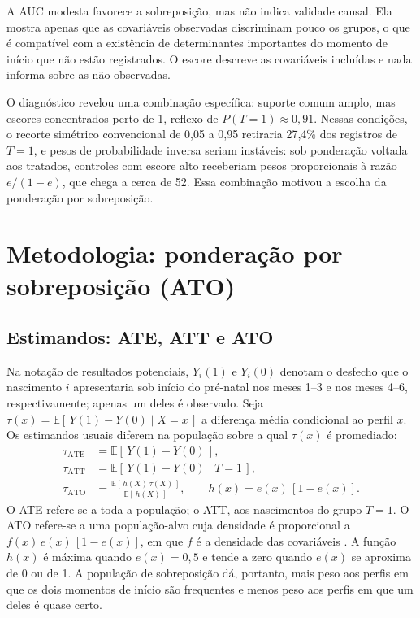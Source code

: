 \documentclass[11pt,a4paper]{article}
\newcommand{\E}{\mathbb{E}}
\newcommand{\ATO}{\mathrm{ATO}}
\begin{document}
A AUC modesta favorece a sobreposição, mas não indica validade causal. Ela mostra apenas
que as covariáveis observadas discriminam pouco os grupos, o que é compatível com a
existência de determinantes importantes do momento de início que não estão registrados. O
escore descreve as covariáveis incluídas e nada informa sobre as não observadas.

O diagnóstico revelou uma combinação específica: suporte comum amplo, mas escores
concentrados perto de 1, reflexo de $P(T=1) \approx 0{,}91$. Nessas condições, o recorte
simétrico convencional de 0,05 a 0,95 retiraria 27,4\% dos registros de $T=1$, e pesos
de probabilidade inversa seriam instáveis: sob ponderação voltada aos tratados, controles
com escore alto receberiam pesos proporcionais à razão $e/(1-e)$, que chega a cerca de 52.
Essa combinação motivou a escolha da ponderação por sobreposição.

\section{Metodologia: ponderação por sobreposição (ATO)}\label{sec:ato}

\subsection{Estimandos: ATE, ATT e ATO}

Na notação de resultados potenciais, $Y_i(1)$ e $Y_i(0)$ denotam o desfecho que o
nascimento $i$ apresentaria sob início do pré-natal nos meses 1--3 e nos meses 4--6,
respectivamente; apenas um deles é observado. Seja
$\tau(x) = \E[\,Y(1) - Y(0) \mid X = x\,]$ a diferença média condicional ao perfil $x$. Os
estimandos usuais diferem na população sobre a qual $\tau(x)$ é promediado:
\begin{align}
\tau_{\mathrm{ATE}} &= \E\left[\,Y(1) - Y(0)\,\right], \label{eq:ate}\\
\tau_{\mathrm{ATT}} &= \E\left[\,Y(1) - Y(0) \mid T = 1\,\right], \label{eq:att}\\
\tau_{\ATO} &= \frac{\E\left[\,h(X)\,\tau(X)\,\right]}{\E\left[\,h(X)\,\right]},
  \qquad h(x) = e(x)\,\left[1 - e(x)\right]. \label{eq:ato}
\end{align}
O ATE refere-se a toda a população; o ATT, aos nascimentos do grupo $T=1$. O ATO
refere-se a uma população-alvo cuja densidade é proporcional a $f(x)\,e(x)\,[1-e(x)]$, em
que $f$ é a densidade das covariáveis \cite{li2018}. A função $h(x)$ é máxima quando
$e(x) = 0{,}5$ e tende a zero quando $e(x)$ se aproxima de 0 ou de 1. A população de
sobreposição dá, portanto, mais peso aos perfis em que os dois momentos de início são
frequentes e menos peso aos perfis em que um deles é quase certo.
\end{document}
